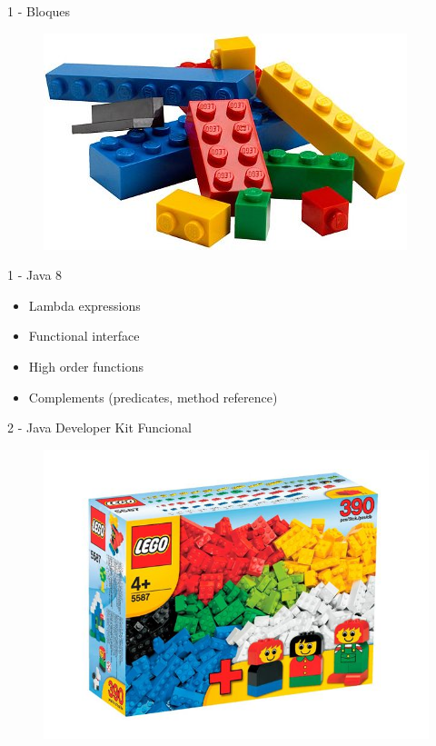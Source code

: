 \documentclass{beamer}
\begin{document}
\begin{frame}{1 - Bloques}
\begin{figure}
\centering
\includegraphics[width=0.9\linewidth]{Images/lego-parts}
\end{figure}
\end{frame}

\begin{frame}{1 - Java 8}
\begin{itemize}
\item Lambda expressions
\item Functional interface
\item High order functions
\item Complements (predicates, method reference)
\end{itemize}
\end{frame}

\begin{frame}{2 - Java Developer Kit Funcional}
\begin{figure}
\centering
\includegraphics[width=0.9\linewidth]{Images/basic}
\end{figure}
\end{frame}
\end{document}

